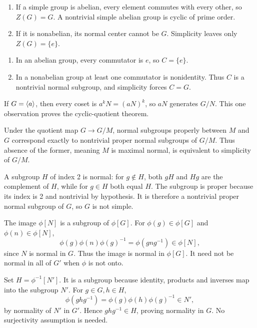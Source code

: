 \begin{enumerate}[label=(\alph*)]
\item If a simple group is abelian, every element commutes with every other, so $Z(G)=G$. A nontrivial simple abelian group is cyclic of prime order.
\item If it is nonabelian, its normal center cannot be $G$. Simplicity leaves only $Z(G)=\{e\}$.
\end{enumerate}

\begin{enumerate}[label=(\alph*)]
\item In an abelian group, every commutator is $e$, so $C=\{e\}$.
\item In a nonabelian group at least one commutator is nonidentity. Thus $C$ is a nontrivial normal subgroup, and simplicity forces $C=G$.
\end{enumerate}

If $G=\langle a\rangle$, then every coset is $a^kN=(aN)^k$, so $aN$ generates $G/N$. This one observation proves the cyclic-quotient theorem.

Under the quotient map $G\to G/M$, normal subgroups properly between $M$ and $G$ correspond exactly to nontrivial proper normal subgroups of $G/M$. Thus absence of the former, meaning $M$ is maximal normal, is equivalent to simplicity of $G/M$.

A subgroup $H$ of index 2 is normal: for $g\notin H$, both $gH$ and $Hg$ are the complement of $H$, while for $g\in H$ both equal $H$. The subgroup is proper because its index is 2 and nontrivial by hypothesis. It is therefore a nontrivial proper normal subgroup of $G$, so $G$ is not simple.

The image $\phi[N]$ is a subgroup of $\phi[G]$. For $\phi(g)\in\phi[G]$ and $\phi(n)\in\phi[N]$,
\[\phi(g)\phi(n)\phi(g)^{-1}=\phi(gng^{-1})\in\phi[N],\]
since $N$ is normal in $G$. Thus the image is normal in $\phi[G]$. It need not be normal in all of $G'$ when $\phi$ is not onto.

Set $H=\phi^{-1}[N']$. It is a subgroup because identity, products and inverses map into the subgroup $N'$. For $g\in G,h\in H$,
\[\phi(ghg^{-1})=\phi(g)\phi(h)\phi(g)^{-1}\in N',\]
by normality of $N'$ in $G'$. Hence $ghg^{-1}\in H$, proving normality in $G$. No surjectivity assumption is needed.

